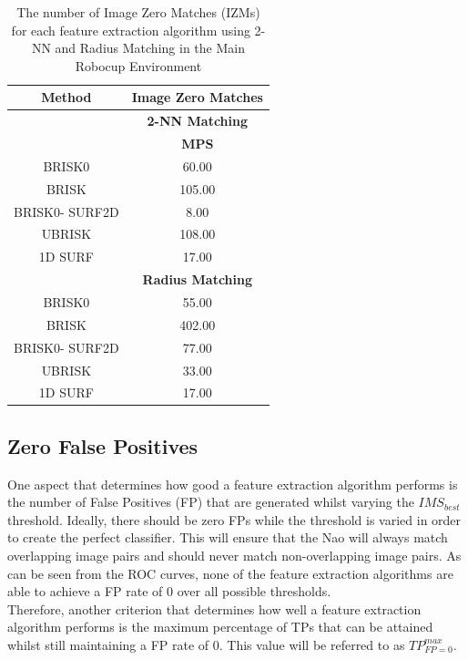 \documentclass[11pt]{report}
\begin{document}
\begin{table}
\centering
\caption{The number of Image Zero Matches (IZMs) for each feature extraction
algorithm using 2-NN and Radius Matching in the Main Robocup Environment}
\begin{tabular}{|c|c|}
\hline 
\textbf{Method} & \multicolumn{1}{c|}{\textbf{Image Zero Matches}}\tabularnewline
\hline 
 & \multicolumn{1}{c|}{\textbf{2-NN Matching}}\tabularnewline
\hline 
 & \textbf{MPS}\tabularnewline
\hline 
\hline 
BRISK0 & 60.00\tabularnewline
\hline 
BRISK & 105.00\tabularnewline
\hline 
BRISK0- SURF2D & 8.00\tabularnewline
\hline 
UBRISK & 108.00\tabularnewline
\hline 
1D SURF & 17.00\tabularnewline
\hline 
 & \multicolumn{1}{c|}{\textbf{Radius Matching}}\tabularnewline
\hline 
BRISK0 & 55.00\tabularnewline
\hline 
BRISK & 402.00\tabularnewline
\hline 
BRISK0- SURF2D & 77.00\tabularnewline
\hline 
UBRISK & 33.00\tabularnewline
\hline 
1D SURF & 17.00\tabularnewline
\hline 
\end{tabular}
\label{tab:mrd_izm}
\end{table}

\subsection{Zero False Positives}
\label{sec:zfp}
One aspect that determines how good a feature extraction algorithm performs is the number of False Positives (FP) that are generated whilst varying the $IMS_{best}$ threshold. Ideally, there should be zero FPs while the threshold is varied in order to create the perfect classifier. This will ensure that the Nao will always match overlapping image pairs and should never match non-overlapping image pairs. As can be seen from the ROC curves, none of the feature extraction algorithms are able to achieve a FP rate of $0$ over all possible thresholds.\\

Therefore, another criterion that determines how well a feature extraction algorithm performs is the maximum percentage of TPs that can be attained whilst still maintaining a FP rate of $0$. This value will be referred to as $TP_{FP=0}^{max}$.  \\
\end{document}
